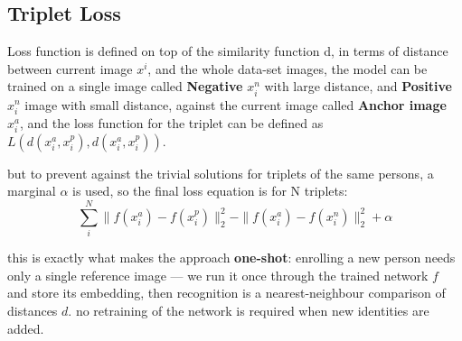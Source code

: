 \documentclass[4apaper,12pt]{book}
\begin{document}
\begin{description}
\begin{description}
      \subsection{Triplet Loss}
      \begin{description}
      \item Loss function is defined on top of the similarity function d, in terms of  distance between current image $x^i$, and the whole data-set images, the model can be trained on a single image called \textbf{Negative} $x_i^{n}$ with large distance, and \textbf{Positive} $x_i^{n}$ image with small distance, against the current image called \textbf{Anchor image} $x_i^{a}$, and the loss function for the triplet can be defined as $L(d(x_i^a,x_i^p), d(x_i^a,x_i^p))$.
      \item but to prevent against the trivial solutions for triplets of the same persons, a marginal $\alpha$ is used, so the final loss equation is for N triplets: $$
         \sum_i^N {\|f(x_i^a) - f(x_i^p)\|_2^2  - \|f(x_i^a) - f(x_i^n)\|_2^2} + \alpha
        $$
      \end{description}
    \item this is exactly what makes the approach \textbf{one-shot}: enrolling a new person needs only a single reference image --- we run it once through the trained network $f$ and store its embedding, then recognition is a nearest-neighbour comparison of distances $d$. no retraining of the network is required when new identities are added.

\end{description}
\end{description}
\end{document}
